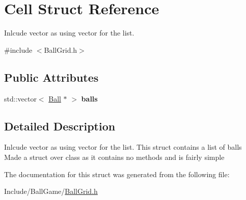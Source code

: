 \hypertarget{structCell}{
\section{Cell Struct Reference}
\label{structCell}
}


Inlcude vector as using vector for the list.  


{\ttfamily \#include $<$BallGrid.h$>$}\subsection*{Public Attributes}
\begin{DoxyCompactItemize}
\item 
\hypertarget{structCell_a69885480f0ba645aa3e9c35d1b0580c3}{
std::vector$<$ \hyperlink{structBall}{Ball} $\ast$ $>$ {\bfseries balls}}
\label{structCell_a69885480f0ba645aa3e9c35d1b0580c3}

\end{DoxyCompactItemize}


\subsection{Detailed Description}
Inlcude vector as using vector for the list. This struct contains a list of balls Made a struct over class as it contains no methods and is fairly simple 

The documentation for this struct was generated from the following file:\begin{DoxyCompactItemize}
\item 
Include/BallGame/\hyperlink{BallGrid_8h}{BallGrid.h}\end{DoxyCompactItemize}

